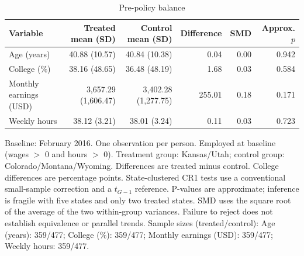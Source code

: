 \begin{table}[htbp]
\centering
\small
\setlength{\tabcolsep}{4pt}
\caption{Pre-policy balance}
\label{tab:baseline_balance}
\begin{tabular}{lrrrrr}
\hline
Variable & Treated mean (SD) & Control mean (SD) & Difference & SMD & Approx. $p$ \\
\hline
Age (years) & 40.88 (10.57) & 40.84 (10.38) & 0.04 & 0.00 & 0.942 \\
College (\%) & 38.16 (48.65) & 36.48 (48.19) & 1.68 & 0.03 & 0.584 \\
Monthly earnings (USD) & 3,657.29 (1,606.47) & 3,402.28 (1,277.75) & 255.01 & 0.18 & 0.171 \\
Weekly hours & 38.12 (3.21) & 38.01 (3.24) & 0.11 & 0.03 & 0.723 \\
\hline
\end{tabular}
\par\smallskip
\begin{minipage}{\textwidth}
\footnotesize
Baseline: February 2016. One observation per person. Employed at baseline (wages $>$ 0 and hours $>$ 0).
 Treatment group: Kansas/Utah; control group: Colorado/Montana/Wyoming. Differences are treated minus control. College differences are percentage points.
 State-clustered CR1 tests use a conventional small-sample correction and a $t_{G-1}$ reference. P-values are approximate; inference is fragile with five states and only two treated states.
 SMD uses the square root of the average of the two within-group variances. Failure to reject does not establish equivalence or parallel trends.
 Sample sizes (treated/control): Age (years): 359/477; College (\%): 359/477; Monthly earnings (USD): 359/477; Weekly hours: 359/477.
\end{minipage}
\end{table}
